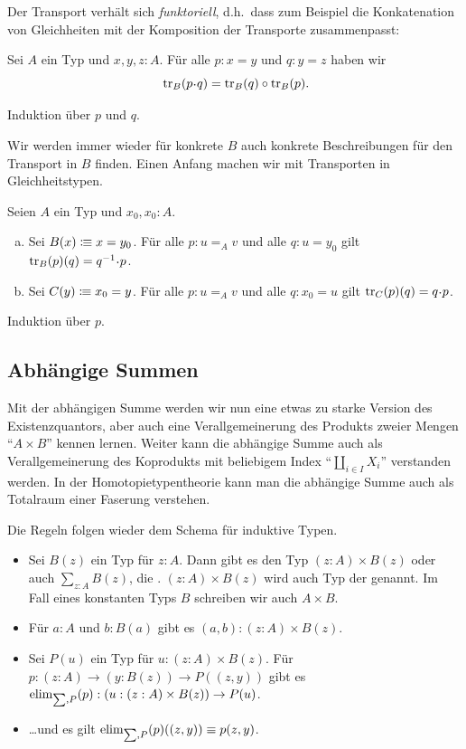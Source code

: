 Der Transport verhält sich \emph{funktoriell}, d.h.\ dass zum Beispiel die Konkatenation von Gleichheiten mit der Komposition der Transporte zusammenpasst:

\begin{lemma}
  Sei $A$ ein Typ und $x,y,z:A$. Für alle $p:x=y$ und $q:y=z$ haben wir
  \[
    \transp_B(p\kon q) = \transp_B(q) \circ \transp_B(p)\rlap{.}
  \]
\end{lemma}
\begin{beweis}
  Induktion über $p$ und $q$.
\end{beweis}

Wir werden immer wieder für konkrete $B$ auch konkrete Beschreibungen für den Transport in $B$ finden.
Einen Anfang machen wir mit Transporten in Gleichheitstypen.

\begin{lemma}
  \label{transport-gleichheitstyp}
  Seien $A$ ein Typ und $x_0,x_0:A$.
  \begin{enumerate}[(a)]
  \item Sei $B(x)\vcentcolon\mspace{-1.2mu}\equiv x=y_0$. Für alle $p:u=_Av$ und alle $q:u=y_0$ gilt $\transp_B(p)(q)=q^{-1}\kon p$.
  \item Sei $C(y)\vcentcolon\mspace{-1.2mu}\equiv x_0=y$. Für alle $p:u=_Av$ und alle $q:x_0=u$ gilt $\transp_C(p)(q)=q\kon p$.
  \end{enumerate}
\end{lemma}
\begin{beweis}
  Induktion über $p$.
\end{beweis}

\subsection{Abhängige Summen}
Mit der abhängigen Summe werden wir nun eine etwas zu starke Version des Existenzquantors, aber auch eine Verallgemeinerung des Produkts zweier Mengen ``$A\times B$'' kennen lernen.
Weiter kann die abhängige Summe auch als Verallgemeinerung des Koprodukts mit beliebigem Index ``$\coprod_{i\in I}X_i$'' verstanden werden.
In der Homotopietypentheorie kann man die abhängige Summe auch als Totalraum einer Faserung verstehen.

Die Regeln folgen wieder dem Schema für induktive Typen.

\begin{regeln}
\begin{itemize}
\item Sei $B(z)$ ein Typ für $z:A$. Dann gibt es den Typ $(z:A)\times B(z)$ oder auch $\sum_{z:A}B(z)$,
  die .
  $(z:A)\times B(z)$ wird auch Typ der  genannt.
  Im Fall eines konstanten Typs $B$ schreiben wir auch $A\times B$.
\item Für $a:A$ und $b:B(a)$ gibt es $(a,b):(z:A)\times B(z)$.
\item Sei $P(u)$ ein Typ für $u:(z:A)\times B(z)$.
  Für $p:(z:A) \to (y : B(z)) \to P((z,y))$ gibt es $\mathrm{elim}_{\sum,P}(p):(u:(z:A)\times B(z))\to P(u)$.
\item \dots und es gilt $\mathrm{elim}_{\sum,P}(p)((z,y))\equiv p(z,y)$.
\end{itemize}
\end{regeln}

